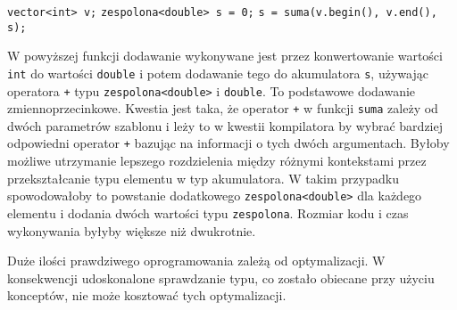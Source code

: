 \documentclass[11pt, a4paper]{article}
\begin{document}
\noindent \verb#vector<int> v;#  \newline
\verb#zespolona<double> s = 0;#  \newline
\verb#s = suma(v.begin(), v.end(), s);#  \newline

W powyższej funkcji dodawanie wykonywane jest przez konwertowanie wartości \verb#int# do wartości \verb#double# i potem dodawanie tego do akumulatora \verb#s#, używając operatora \verb#+# typu \verb#zespolona<double># i \verb#double#. To podstawowe dodawanie zmiennoprzecinkowe. Kwestia jest taka, że operator \verb#+# w funkcji \verb#suma# zależy od dwóch parametrów szablonu i leży to w kwestii kompilatora by wybrać bardziej odpowiedni operator \verb#+# bazując na informacji o tych dwóch argumentach. Byłoby możliwe utrzymanie lepszego rozdzielenia między różnymi kontekstami przez przekształcanie typu elementu w typ akumulatora. W takim przypadku spowodowałoby to powstanie dodatkowego \verb#zespolona<double># dla każdego elementu i dodania dwóch wartości typu \verb#zespolona#. Rozmiar kodu i czas wykonywania byłyby większe niż dwukrotnie.

Duże ilości prawdziwego oprogramowania zależą od optymalizacji. W konsekwencji udoskonalone sprawdzanie typu, co zostało obiecane przy użyciu konceptów, nie może kosztować tych optymalizacji.
\end{document}
